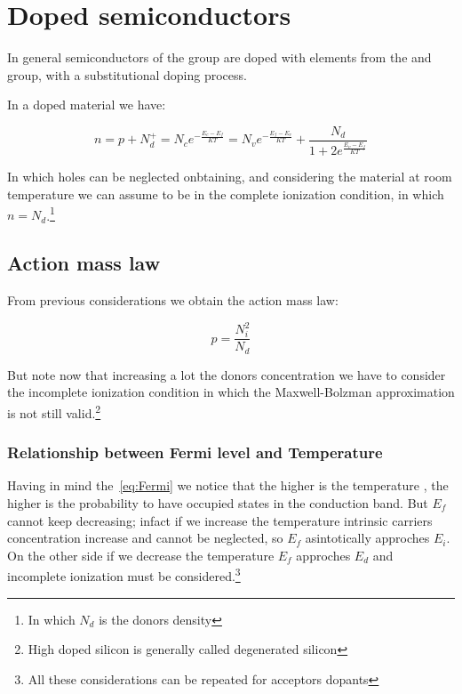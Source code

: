 \chapter{Doped semiconductors} %
	
	\label{cha:doped_semiconductors}
	
	In general semiconductors of the  group are doped with elements from the  and  group, with a substitutional doping process.

	In a doped material we have:

	\begin{equation}
		n=p+N_d^+=N_ce^{-\frac{E_c-E_f}{KT}}=N_ve^{-\frac{E_f-E_v}{KT}}+\frac{N_d}{1+2e^{\frac{E_v-E_f}{KT}}}
	\end{equation}

	In which holes can be neglected onbtaining, and considering the material at room temperature we can assume to be in the complete ionization condition, in which $n= N_d$.\footnote{In which $N_d$ is the donors density}

	\section{Action mass law} %
		
		\label{cha:action_mass_law}

		From previous considerations we obtain the action mass law:

		\begin{equation}
			p=\frac{N_i^2}{N_d}
		\end{equation}

		But note now that increasing a lot the donors concentration we have to consider the incomplete ionization condition in which the Maxwell-Bolzman approximation is not still valid.\footnote{High doped silicon is generally called degenerated silicon}

		\subsection{Relationship between Fermi level and Temperature} %
		
			\label{sub:relationship_between_fermi_level_and_temperature}

			Having in mind the~\ref{eq:Fermi} we notice that the higher is the temperature , the higher is the probability to have occupied states in the conduction band.
			But $E_f$ cannot keep decreasing; infact if we increase the temperature intrinsic carriers concentration increase and cannot be neglected, so $E_f$ asintotically approches $E_i$.
			On the other side if we decrease the temperature $E_f$ approches $E_d$ and incomplete ionization must be considered.\footnote{All these considerations can be repeated for acceptors dopants}

